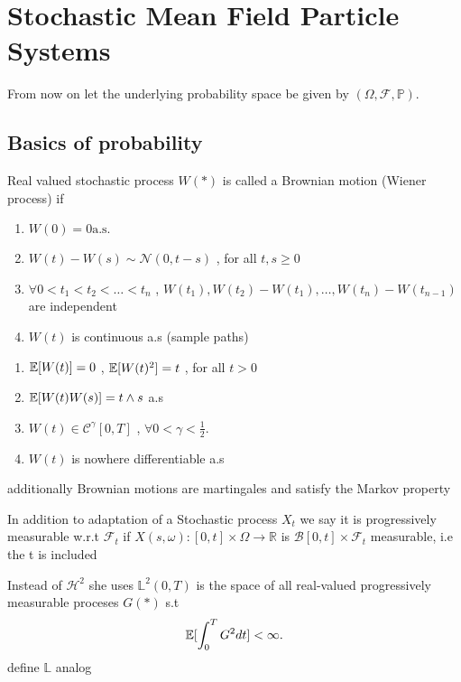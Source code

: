 \chapter{Stochastic Mean Field Particle Systems}
From now on let the underlying probability space be given by $(\Omega ,\mathcal{F},\mathbb{P})$.
\section{Basics of probability}
\begin{definition}
  Real valued stochastic process $W(*)$ is called a Brownian motion (Wiener process) if 
  \begin{enumerate}
    \item $W(0)= 0  \text{a.s.}$ 
    \item $W(t) - W(s) \sim \mathcal{N}(0,t-s)$ , for all $t,s\ge 0$ 
    \item $\forall  0< t_{1} < t_{2} < \ldots  < t_n$  , $W(t_{1}),W(t_{2})-W(t_{1}),\ldots,W(t_n) - W(t_{n-1})$ are independent 
    \item $W(t)$ is continuous a.s (sample paths) 
  \end{enumerate}
\end{definition}
\begin{remark}[Properties]
  \begin{enumerate}
    \item $\mathbb{E}[W(t)] = 0$  , $\mathbb{E}[W(t)^2] = t$ , for all $t>0$
    \item $\mathbb{E}[W(t)W(s)]=t \land s$ a.s
    \item $W(t) \in  \mathcal{C}^{\gamma }[0,T] $ , $\forall 0 < \gamma < \frac{1}{2}$.
    \item $W(t)$ is nowhere differentiable  a.s
  \end{enumerate}
  additionally Brownian motions are martingales and satisfy the Markov property 
\end{remark}
\begin{definition}
  In addition to adaptation of a Stochastic process $X_t$  we say it is progressively measurable w.r.t $\mathcal{F}_t$
  if $X(s,\omega ) : [0,t] \times  \Omega  \to  \mathbb{R}$ is $\mathcal{B}[0,t] \times  \mathcal{F}_t$ measurable, i.e the t is included 
\end{definition}
\begin{definition}
  Instead of $\mathcal{H}^{2} $  she uses $\mathbb{L}^2(0,T)$ is the space of all real-valued progressively measurable proceses $G(*)$ s.t
  \begin{align*}
    \mathbb{E}[\int_0^{T} G^2 dt] < \infty 
  .\end{align*}
  define $\mathbb{L}$ analog
\end{definition}
